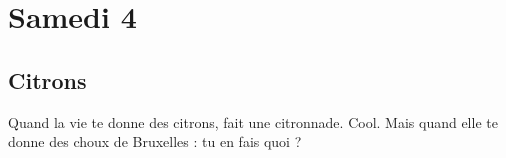 ﻿\section*{Samedi 4}
\subsection*{Citrons}
Quand la vie te donne des citrons, fait une citronnade. 
Cool. Mais quand elle te donne des choux de Bruxelles : tu en fais quoi ?

